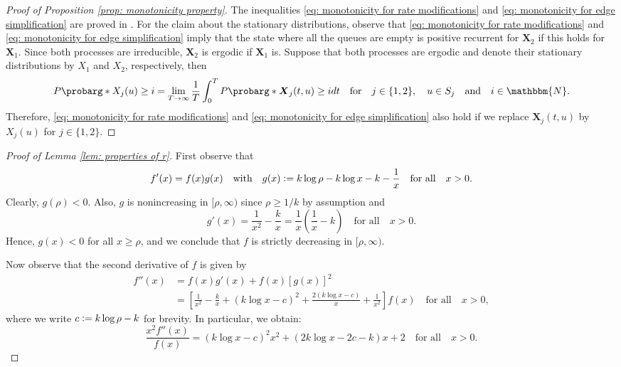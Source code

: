 \documentclass[a4paper, 12pt]{article}
\theoremstyle{definition}
\newcommand{\defeq}{\vcentcolon=}
\newcommand{\bX}{\boldsymbol{X}}
\newcommand{\N}{\mathbbm{N}}
\newcommand{\cprob}{P\probarg}
\begin{document}
\begin{appendices}
\begin{proof}[Proof of Proposition \ref{prop: monotonicity property}]
	The inequalities \eqref{eq: monotonicity for rate modifications} and \eqref{eq: monotonicity for edge simplification} are proved in \cite[Section 7.2]{goldsztajn2024server}. For the claim about the stationary distributions, observe that \eqref{eq: monotonicity for rate modifications} and \eqref{eq: monotonicity for edge simplification} imply that the state where all the queues are empty is positive recurrent for $\bX_2$ if this holds for $\bX_1$. Since both processes are irreducible, $\bX_2$ is ergodic if $\bX_1$ is. Suppose that both processes are ergodic and denote their stationary distributions by $X_1$ and $X_2$, respectively, then
	\begin{equation*}
		\cprob*{X_j(u) \geq i} = \lim_{T \to \infty} \frac{1}{T}\int_0^T \cprob*{\bX_j(t, u) \geq i}dt \quad \text{for} \quad j \in \{1, 2\}, \quad u \in S_j \quad \text{and} \quad i \in \N.
	\end{equation*}
	Therefore, \eqref{eq: monotonicity for rate modifications} and \eqref{eq: monotonicity for edge simplification} also hold if we replace $\bX_j(t, u)$ by $X_j(u)$ for $j \in \{1, 2\}$.
\end{proof}

\begin{proof}[Proof of Lemma \ref{lem: properties of r}]
	First observe that
	\begin{equation*}
		f'(x) = f(x)g(x) \quad \text{with} \quad g(x) \defeq k\log \rho - k \log x - k - \frac{1}{x} \quad \text{for all} \quad x > 0.
	\end{equation*}
	Clearly, $g(\rho) < 0$. Also, $g$ is nonincreasing in $[\rho, \infty)$ since $\rho \geq 1 / k$ by assumption and
	\begin{equation*}
		g'(x) = \frac{1}{x^2} - \frac{k}{x} = \frac{1}{x}\left(\frac{1}{x} - k\right) \quad \text{for all} \quad x > 0.
	\end{equation*}
	Hence, $g(x) < 0$ for all $x \geq \rho$, and we conclude that $f$ is strictly decreasing in $[\rho, \infty)$.
	
	Now observe that the second derivative of $f$ is given by
	\begin{align*}
		f''(x) &= f(x)g'(x) + f(x)\left[g(x)\right]^2 \\
		&= \left[\frac{1}{x^2} - \frac{k}{x} + \left(k\log x - c\right)^2 + \frac{2\left(k\log x - c\right)}{x} + \frac{1}{x^2}\right]f(x) \quad \text{for all} \quad x > 0,
	\end{align*} 
	where we write $c \defeq k\log \rho - k$ for brevity. In particular, we obtain:
	\begin{equation*}
		\frac{x^2f''(x)}{f(x)} = \left(k\log x - c\right)^2x^2 + \left(2k\log x - 2c - k\right)x + 2 \quad \text{for all} \quad x > 0.
	\end{equation*}
	

\end{proof}
\end{appendices}
\end{document}
